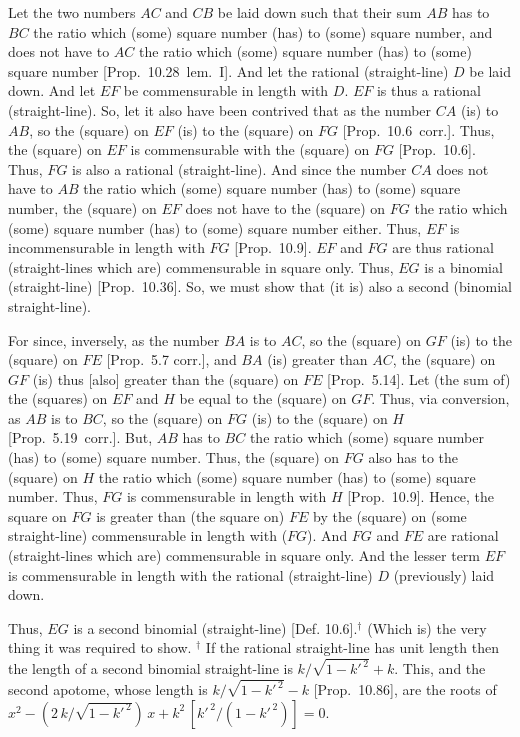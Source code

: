 Let the two numbers $AC$ and $CB$ be laid down such that their sum $AB$
has to $BC$ the ratio which (some) square number (has) to (some)
square number, and does not have to $AC$ the ratio which (some)
square number (has) to (some) square number [Prop.~10.28~lem.~I]. And let the rational (straight-line) $D$ be laid down. And let $EF$ be commensurable in length with $D$.
$EF$ is thus a rational (straight-line).
So, let it also have been contrived that as the number $CA$ (is) to $AB$,
so the (square) on $EF$ (is) to the (square) on $FG$ [Prop.~10.6~corr.]. Thus, the (square) on $EF$
is commensurable with the (square) on $FG$ [Prop.~10.6]. Thus, $FG$ is also a rational
(straight-line). And since the number $CA$ does not have to $AB$ the ratio
which (some) square number (has) to (some) square number, the
(square) on $EF$ does not have to the (square) on $FG$ the ratio
which (some) square number (has) to (some) square number either.
Thus, $EF$  is incommensurable in length with $FG$ [Prop.~10.9]. $EF$ and $FG$
are thus rational (straight-lines which are) commensurable in square only.
Thus, $EG$ is a binomial (straight-line) [Prop.~10.36]. So, we must show
that (it is) also a second (binomial straight-line).

For since, inversely, as the number $BA$ is to $AC$, so the (square)
on $GF$ (is) to the (square) on $FE$ [Prop.~5.7 corr.],
and $BA$ (is) greater than $AC$, the (square) on $GF$ (is)
thus [also] greater than the (square) on $FE$ [Prop.~5.14]. Let (the sum of) the (squares) on $EF$ and $H$ be equal to the (square) on $GF$. Thus, via conversion, as 
$AB$ is to $BC$, so the (square) on $FG$ (is) to the (square) on $H$
[Prop.~5.19~corr.]. But, $AB$ has to $BC$ the
ratio which (some) square number (has) to (some) square number. Thus,
the (square) on $FG$ also has to the (square) on $H$ the ratio
which (some) square number (has) to (some) square number. Thus,
$FG$ is commensurable in length with $H$ [Prop.~10.9]. Hence, the square on $FG$ is
greater than (the square on) $FE$ by the (square) on (some straight-line)
commensurable in length with ($FG$). And $FG$ and $FE$ are rational (straight-lines which
are) commensurable in square only. And  the lesser term $EF$ is commensurable in length with the rational (straight-line) $D$ (previously)
laid down.

Thus, $EG$ is a second binomial (straight-line) [Def. 10.6].$^\dag$ (Which is) the very thing it
was required to show.
{\footnotesize\noindent $^\dag$ If the rational straight-line has unit length then the length of a second binomial straight-line
is  $k/\sqrt{1-k'^{\,2}}+k$. This, and the second apotome,
whose length is $k/\sqrt{1-k'^{\,2}}-k$ [Prop.~10.86],
are the roots of $x^2- (2\,k/\sqrt{1-k'^{\,2}})\,x+k^2\,[k'^{\,2}/(1-k'^{\,2})]=0$.}  

